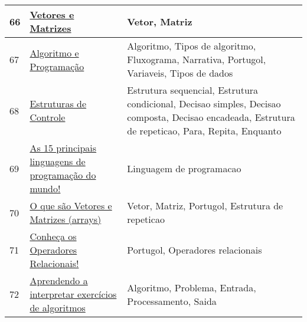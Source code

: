 \begin{longtable}{| p{} | p{} | p{} |}
66  & \href{http://www.univasf.edu.br/~andreza.leite/aulas/AP/VetoresMatrizes.pdf}{\color{blue} Vetores e Matrizes                                                                  } & Vetor, Matriz                                                                                                                                     \\ \hline
67  & \href{http://www.univasf.edu.br/~jose.valentim/aula1.pdf}{\color{blue} Algoritmo e Programação                                                             } & Algoritmo, Tipos de algoritmo, Fluxograma, Narrativa, Portugol, Variaveis, Tipos de dados                                                         \\ \hline
68  & \href{http://www.univasf.edu.br/~ricardo.aramos/disciplinas/AlgProgAgr\_2011\_1/cap03AnaEmilia.pdf}{\color{blue} Estruturas de Controle                                                              } & Estrutura sequencial, Estrutura condicional, Decisao simples, Decisao composta, Decisao encadeada, Estrutura de repeticao, Para, Repita, Enquanto \\ \hline
69  & \href{https://becode.com.br/principais-linguagens-de-programacao/}{\color{blue} As 15 principais linguagens de programação do mundo!                                } & Linguagem de programacao                                                                                                                          \\ \hline
70  & \href{https://dicasdeprogramacao.com.br/o-que-sao-vetores-e-matrizes-arrays/}{\color{blue} O que são Vetores e Matrizes (arrays)                                               } & Vetor, Matriz, Portugol, Estrutura de repeticao                                                                                                   \\ \hline
71  & \href{https://dicasdeprogramacao.com.br/operadores-relacionais/}{\color{blue} Conheça os Operadores Relacionais!                                                  } & Portugol, Operadores relacionais                                                                                                                  \\ \hline
72  & \href{https://lucianopascal.wordpress.com/2010/04/02/aprendendo-a-interpretar-exercicios-de-algoritmos/}{\color{blue} Aprendendo a interpretar exercícios de algoritmos                                   } & Algoritmo, Problema, Entrada, Processamento, Saida                                                                                                \\ \hline

\end{longtable}
